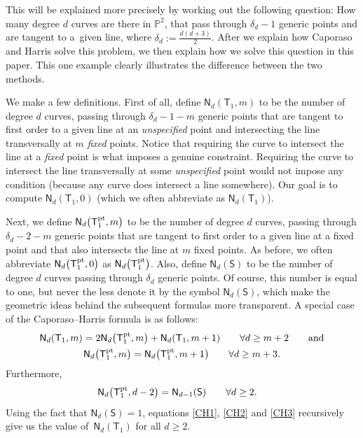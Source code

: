 \documentclass[pdftex]{sigma}
\numberwithin{equation}{section}
\begin{document}
This will be explained more precisely by working out the following
question: How many degree $d$ curves
are there in $\mathbb{P}^2$, that pass through $\delta_d-1$ generic points and are
tangent to a~given line, where $\delta_d := \frac{d(d+3)}{2}$.
After we explain how Caporaso and Harris solve this problem, we then
explain how we solve this question in this paper.
This one example clearly illustrates
the difference between the two methods.

We make a few definitions.
First of all, define
$\mathsf{N}_d(\mathsf{T}_1, m)$ to be the number of
degree $d$ curves, passing through $\delta_d-1-m$ generic points
that are tangent to first order to a given line at an \emph{unspecified} point
and intersecting the line transversally at $m$ \emph{fixed} points.
Notice that requiring the curve to intersect the line at a
\emph{fixed} point is what imposes a genuine constraint.
Requiring the curve to intersect the line transversally at some \emph{unspecified}
point would not impose any condition (because any curve does intersect a line somewhere).
Our goal is to compute $\mathsf{N}_d(\mathsf{T}_1, 0)$
(which we often abbreviate as $\mathsf{N}_d(\mathsf{T}_1)$).

Next, we define
$\mathsf{N}_d\bigl(\mathsf{T}_1^{\textnormal{pt}}, m\bigr)$ to be the
number of
degree $d$ curves, passing through $\delta_d-2-m$ generic points
that are tangent to first order to a given line at a
fixed point and that also intersects the line at $m$ fixed points.
As before, we often abbreviate
$\mathsf{N}_d\bigl(\mathsf{T}_1^{\textnormal{pt}}, 0\bigr)$ as
$\mathsf{N}_d\bigl(\mathsf{T}_1^{\textnormal{pt}}\bigr)$.
Also, define $\mathsf{N}_d(\mathsf{S})$ to be the number of
degree $d$ curves passing through $\delta_d$ generic
points. Of course, this number is equal to one, but never the less
denote it by the symbol $\mathsf{N}_d(\mathsf{S})$, which make the geometric
ideas behind the subsequent formulas more transparent.
A special case of the Caporaso--Harris formula \cite[p.~348, Theorem 1.1]{CH}
is as follows:
\begin{gather}
\mathsf{N}_d(\mathsf{T}_1, m)  =
2 \mathsf{N}_d\bigl(\mathsf{T}_1^{\textnormal{pt}}, m\bigr) +
\mathsf{N}_d(\mathsf{T}_1, m+1) \qquad \forall  d \geq m+2 \qquad \textnormal{and} \label{CH1}\\
\mathsf{N}_d\bigl(\mathsf{T}_1^{\textnormal{pt}}, m\bigr) =
\mathsf{N}_d\bigl(\mathsf{T}_1^{\textnormal{pt}}, m+1\bigr)  \qquad \forall  d \geq m+3.
\label{CH2}
\end{gather}
Furthermore,
\begin{align}
\mathsf{N}_d\bigl(\mathsf{T}_1^{\textnormal{pt}}, d-2\bigr) & = \mathsf{N}_{d-1}(\mathsf{S})
\qquad \forall  d \geq 2. \label{CH3}
\end{align}
Using the fact that $\mathsf{N}_d(\mathsf{S})=1$, equations \eqref{CH1}, \eqref{CH2}
and \eqref{CH3}
recursively give us the value of~$\mathsf{N}_d(\mathsf{T}_1)$ for all $d\geq 2$.
\end{document}
